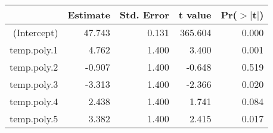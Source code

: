\begin{table}[ht]
\centering
\begin{tabular}{rrrrr}
  \hline
 & Estimate & Std. Error & t value & Pr($>$$|$t$|$) \\ 
  \hline
(Intercept) & 47.743 & 0.131 & 365.604 & 0.000 \\ 
  temp.poly.1 & 4.762 & 1.400 & 3.400 & 0.001 \\ 
  temp.poly.2 & -0.907 & 1.400 & -0.648 & 0.519 \\ 
  temp.poly.3 & -3.313 & 1.400 & -2.366 & 0.020 \\ 
  temp.poly.4 & 2.438 & 1.400 & 1.741 & 0.084 \\ 
  temp.poly.5 & 3.382 & 1.400 & 2.415 & 0.017 \\ 
   \hline
\end{tabular}
\end{table}
